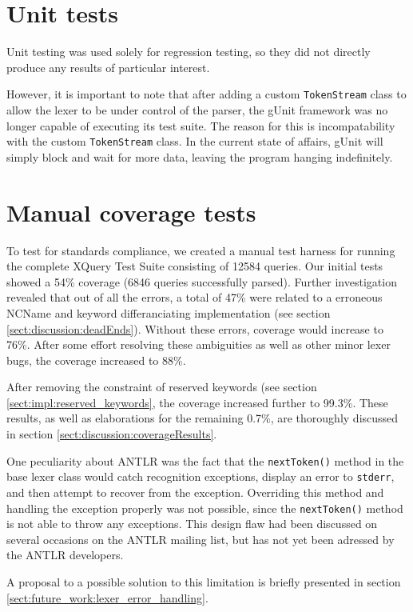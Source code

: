 \label{sect:results:tests}
\section{Unit tests}
\label{sect:results:tests:unit}
Unit testing was used solely for regression testing, so they did not directly 
produce any results of particular interest.

However, it is important to note that after adding a custom \verb!TokenStream! class to
allow the lexer to be under control of the parser, the gUnit framework was no
longer capable of executing its test suite. The reason for this is
incompatability with the custom \verb!TokenStream! class. In the current state of
affairs, gUnit will simply block and wait for more data, leaving the program
hanging indefinitely. 

\section{Manual coverage tests}
\label{sect:tests:manual}
To test for standards compliance, we created a manual test harness for running
the complete XQuery Test Suite\cite{w3c05} consisting of 12584 queries. Our
initial tests showed a 54\% coverage (6846 queries successfully parsed). Further
investigation revealed that out of all the errors, a total of 47\% were related
to a erroneous NCName and keyword differanciating implementation (see section
\ref{sect:discussion:deadEnds}). Without these errors, coverage would increase
to 76\%. After some effort resolving these ambiguities as well as other minor
lexer bugs, the coverage increased to 88\%.

After removing the constraint of reserved keywords (see section
\ref{sect:impl:reserved_keywords}, the coverage increased further to 99.3\%.
These results, as well as elaborations for the remaining 0.7\%, are thoroughly
discussed in section \ref{sect:discussion:coverageResults}.

One peculiarity about ANTLR was the fact that the \verb!nextToken()! method in
the base lexer class would catch recognition exceptions, display an error to \verb!stderr!, and
then attempt to recover from the exception. Overriding this method and handling
the exception properly was not possible, since the \verb!nextToken()! method is not
able to throw any exceptions. This design flaw had been discussed on
several occasions on the ANTLR mailing list\cite{antlrmail}, but has not yet
been adressed by the ANTLR developers.

A proposal to a possible solution to this limitation is briefly presented in
section \ref{sect:future_work:lexer_error_handling}.